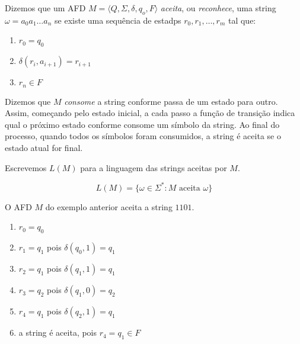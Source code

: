 Dizemos que um AFD $M = \langle Q, \Sigma, \delta, q_o, F \rangle$ {\em aceita}, ou {\em reconhece}, uma string $\omega = a_0 a_1 \dots a_n$ se existe uma sequência de estadps $r_0, r_1, \dots, r_m$ tal que:
\begin{enumerate}
\item $r_0 = q_0$
\item $\delta(r_i, a_{i+1}) = r_{i+1}$
\item $r_n \in F$
\end{enumerate}

Dizemos que $M$ {\em consome} a string conforme passa de um estado para outro.
Assim, começando pelo estado inicial, a cada passo a função de transição indica qual o próximo estado conforme consome um símbolo da string.
Ao final do processo, quando todos os símbolos foram consumidos, a string é aceita se o estado atual for final.

Escrevemos $L(M)$ para a linguagem das strings aceitas por $M$.

\begin{displaymath}
  L(M) = \{\omega \in \Sigma^* : M \textrm{ aceita } \omega\}
\end{displaymath}


\begin{example}
  O AFD $M$ do exemplo anterior aceita a string $1101$.
\begin{enumerate}
\item $r_0 = q_0$
\item $r_1 = q_1$ pois $\delta(q_0, 1) = q_1$
\item $r_2 = q_1$ pois $\delta(q_1, 1) = q_1$
\item $r_3 = q_2$ pois $\delta(q_1, 0) = q_2$
\item $r_4 = q_1$ pois $\delta(q_2, 1) = q_1$
\item a string é aceita, pois $r_4 = q_1 \in F$
\end{enumerate}
\end{example}

